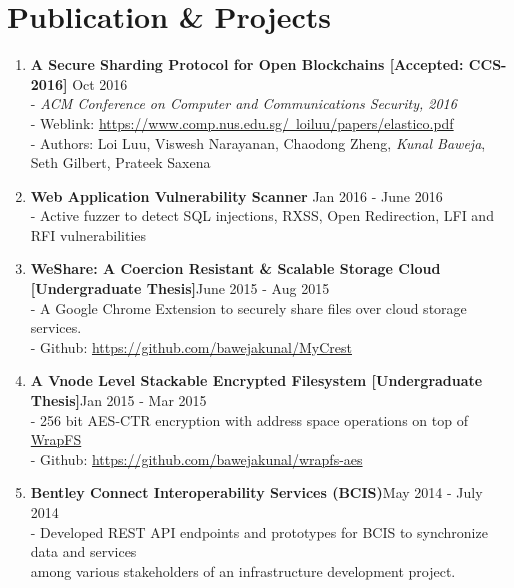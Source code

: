 \documentclass{article}
\begin{document}
\section*{Publication \& Projects}
\begin{enumerate}

    \item \textbf{A Secure Sharding Protocol for Open Blockchains [Accepted: CCS-2016]} {\hfill Oct 2016}\\
    - \textit{ACM Conference on Computer and Communications Security, 2016}\\
    - Weblink: \href{https://www.comp.nus.edu.sg/~loiluu/papers/elastico.pdf}{https://www.comp.nus.edu.sg/~loiluu/papers/elastico.pdf}\\
    - Authors: Loi Luu, Viswesh Narayanan, Chaodong Zheng, \textit{Kunal Baweja}, Seth Gilbert, Prateek Saxena

    \item \textbf{Web Application Vulnerability Scanner} {\hfill Jan 2016 - June 2016}\\
    - Active fuzzer to detect SQL injections, RXSS, Open Redirection, LFI and RFI vulnerabilities 

    \item \textbf{WeShare: A Coercion Resistant \& Scalable Storage Cloud [Undergraduate Thesis]}{\hfill June 2015 - Aug 2015}\\
    - A Google Chrome Extension to securely share files over cloud storage services.\\
    - Github: \href{https://github.com/bawejakunal/MyCrest}{https://github.com/bawejakunal/MyCrest}

    \item \textbf{A Vnode Level Stackable Encrypted Filesystem [Undergraduate Thesis]}{\hfill Jan 2015 - Mar 2015}\\
    - 256 bit AES-CTR encryption with address space operations on top of \href{http://wrapfs.filesystems.org/}{WrapFS}\\
    - Github: \href{https://github.com/bawejakunal/wrapfs-aes}{https://github.com/bawejakunal/wrapfs-aes}
    
    \item \textbf{Bentley Connect Interoperability Services (BCIS)}{\hfill May 2014 - July 2014}\\
    - Developed REST API endpoints and prototypes for BCIS to synchronize data and services\\
    \hspace*{0.7em}among various stakeholders of an infrastructure development project.
    

\end{enumerate}
\end{document}
